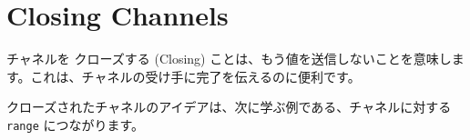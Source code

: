 \section{Closing Channels}

チャネルを クローズする (Closing) ことは、もう値を送信しないことを意味します。これは、チャネルの受け手に完了を伝えるのに便利です。




クローズされたチャネルのアイデアは、次に学ぶ例である、チャネルに対する \texttt{range} につながります。